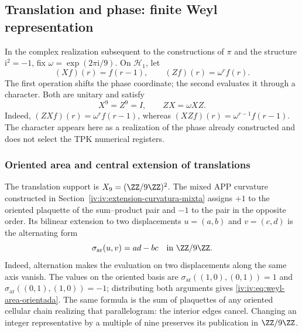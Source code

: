 \subsection{Translation and phase: finite Weyl representation}

In the complex realization subsequent to the constructions of
\(\pi\) and the structure \(\mathrm i^2=-1\), fix
\(\omega=\exp(2\pi\mathrm i/9)\). On \(\mathcal H_1\), let
\begin{equation}
 (Xf)(r)=f(r-1),\qquad (Zf)(r)=\omega^r f(r).
 \label{iv:iv:eq:weyl-operadores}
\end{equation}
The first operation shifts the phase coordinate; the second
evaluates it through a character. Both are unitary and satisfy
\begin{equation}
 X^9=Z^9=I,\qquad ZX=\omega XZ.
 \label{iv:iv:eq:weyl-relacion}
\end{equation}
Indeed, \((ZXf)(r)=\omega^r f(r-1)\), whereas
\((XZf)(r)=\omega^{r-1}f(r-1)\). The character appears here as a
realization of the phase already constructed and does not select the TPK
numerical registers.

\subsubsection{Oriented area and central extension of translations}
\label{iv:iv:weyl-area-extension}

The translation support is \(X_9=(\ZZ/9\ZZ)^2\).
The mixed APP curvature constructed in
Section~\ref{iv:iv:extension-curvatura-mixta} assigns \(+1\) to the
oriented plaquette of the sum--product pair and \(-1\) to the
pair in the opposite order. Its bilinear extension to two displacements
\(u=(a,b)\) and \(v=(c,d)\) is the alternating form
\begin{equation}
 \sigma_{\mathrm{ar}}(u,v)=ad-bc\quad\text{in }\ZZ/9\ZZ.
 \label{iv:iv:eq:weyl-area-orientada}
\end{equation}
Indeed, alternation makes the evaluation on two displacements
along the same axis vanish. The values on the oriented basis are
\(\sigma_{\mathrm{ar}}((1,0),(0,1))=1\) and
\(\sigma_{\mathrm{ar}}((0,1),(1,0))=-1\); distributing both
arguments gives \eqref{iv:iv:eq:weyl-area-orientada}. The same formula is
the sum of plaquettes of any oriented cellular chain realizing
that parallelogram: the interior edges cancel. Changing an
integer representative by a multiple of nine preserves its publication
in \(\ZZ/9\ZZ\).

